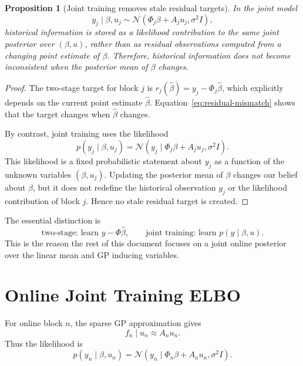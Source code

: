 \documentclass[12pt]{article}
\newtheorem{proposition}{Proposition}
\begin{document}
\begin{proposition}[Joint training removes stale residual targets]
In the joint model
\begin{equation}
y_j\mid \beta,u_j
\sim
\mathcal{N}(\Phi_j\beta+A_j u_j,\sigma^2I),
\end{equation}
historical information is stored as a likelihood contribution to the same joint posterior
over $(\beta,u)$, rather than as residual observations computed from a changing point
estimate of $\beta$. Therefore, historical information does not become inconsistent when
the posterior mean of $\beta$ changes.
\end{proposition}

\begin{proof}
The two-stage target for block $j$ is
$r_j(\hat{\beta})=y_j-\Phi_j\hat{\beta}$, which explicitly depends on the current point
estimate $\hat{\beta}$. Equation~\eqref{eq:residual-mismatch} shows that the target
changes when $\hat{\beta}$ changes.

By contrast, joint training uses the likelihood
\begin{equation}
p(y_j\mid \beta,u_j)
=
\mathcal{N}(y_j\mid \Phi_j\beta+A_j u_j,\sigma^2I).
\end{equation}
This likelihood is a fixed probabilistic statement about $y_j$ as a function of the
unknown variables $(\beta,u_j)$. Updating the posterior mean of $\beta$ changes our
belief about $\beta$, but it does not redefine the historical observation $y_j$ or the
likelihood contribution of block $j$. Hence no stale residual target is created.
\end{proof}

The essential distinction is
\begin{equation}
\text{two-stage: learn } y-\Phi\hat{\beta},
\qquad
\text{joint training: learn } p(y\mid \beta,u).
\end{equation}
This is the reason the rest of this document focuses on a joint online posterior over
the linear mean and GP inducing variables.

\section{Online Joint Training ELBO}

For online block $n$, the sparse GP approximation gives
\begin{equation}
f_n\mid u_n \approx A_nu_n.
\end{equation}
Thus the likelihood is
\begin{equation}
p(y_n\mid \beta,u_n)
=
\mathcal{N}
\left(
y_n\mid \Phi_n\beta+A_nu_n,\sigma^2I
\right).
\label{eq:joint-likelihood}
\end{equation}
\end{document}
